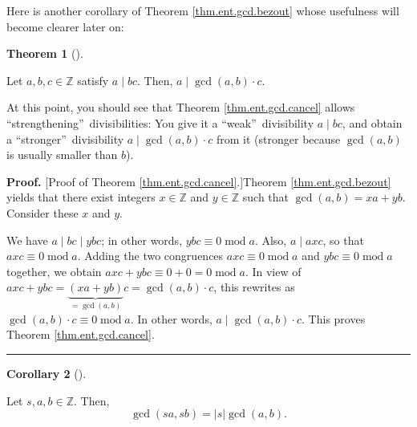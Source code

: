 \documentclass[numbers=enddot,12pt,final,onecolumn,notitlepage]{scrartcl}%
\numberwithin{exer}{subsection}
\theoremstyle{definition}
\newtheorem{theo}{Theorem}[subsection]
\newenvironment{theorem}[1][]
{\begin{theo}[#1]\begin{leftbar}}
{\end{leftbar}\end{theo}}
\newtheorem{coro}[theo]{Corollary}
\newenvironment{corollary}[1][]
{\begin{coro}[#1]\begin{leftbar}}
{\end{leftbar}\end{coro}}
\newenvironment{proof}[1][Proof]{\noindent\textbf{#1.} }{\ \rule{0.5em}{0.5em}}
\begin{document}
Here is another corollary of Theorem \ref{thm.ent.gcd.bezout} whose usefulness
will become clearer later on:

\begin{theorem}
\label{thm.ent.gcd.cancel}Let $a,b,c\in\mathbb{Z}$ satisfy $a\mid bc$. Then,
$a\mid\gcd\left(  a,b\right)  \cdot c$.
\end{theorem}

At this point, you should see that Theorem \ref{thm.ent.gcd.cancel} allows
\textquotedblleft strengthening\textquotedblright\ divisibilities: You give it
a \textquotedblleft weak\textquotedblright\ divisibility $a\mid bc$, and
obtain a \textquotedblleft stronger\textquotedblright\ divisibility $a\mid
\gcd\left(  a,b\right)  \cdot c$ from it (stronger because $\gcd\left(
a,b\right)  $ is usually smaller than $b$).

\begin{proof}
[Proof of Theorem \ref{thm.ent.gcd.cancel}.]Theorem \ref{thm.ent.gcd.bezout}
yields that there exist integers $x\in\mathbb{Z}$ and $y\in\mathbb{Z}$ such
that $\gcd\left(  a,b\right)  =xa+yb$. Consider these $x$ and $y$.

We have $a\mid bc\mid ybc$; in other words, $ybc\equiv0\operatorname{mod}a$.
Also, $a\mid axc$, so that $axc\equiv0\operatorname{mod}a$. Adding the two
congruences $axc\equiv0\operatorname{mod}a$ and $ybc\equiv0\operatorname{mod}%
a$ together, we obtain $axc+ybc\equiv0+0=0\operatorname{mod}a$. In view of
$axc+ybc=\underbrace{\left(  xa+yb\right)  }_{=\gcd\left(  a,b\right)  }%
c=\gcd\left(  a,b\right)  \cdot c$, this rewrites as $\gcd\left(  a,b\right)
\cdot c\equiv0\operatorname{mod}a$. In other words, $a\mid\gcd\left(
a,b\right)  \cdot c$. This proves Theorem \ref{thm.ent.gcd.cancel}.
\end{proof}

\begin{corollary}
\label{cor.ent.gcd.sa,sb}Let $s,a,b\in\mathbb{Z}$. Then,
\[
\gcd\left(  sa,sb\right)  =\left\vert s\right\vert \gcd\left(  a,b\right)  .
\]

\end{corollary}
\end{document}
